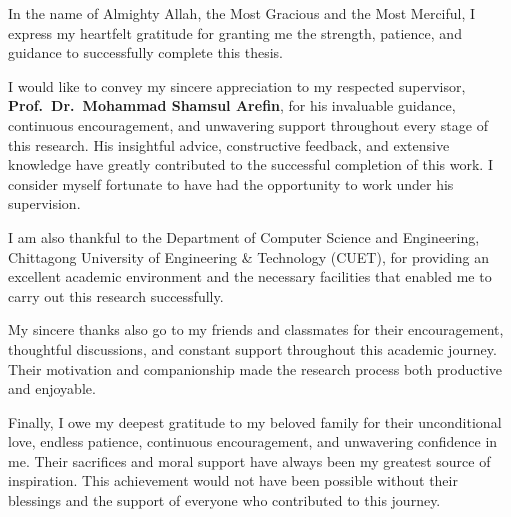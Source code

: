 
\begin{acknowledgements}

\hspace{4em}In the name of Almighty Allah, the Most Gracious and the Most Merciful, I express my heartfelt gratitude for granting me the strength, patience, and guidance to successfully complete this thesis.

\hspace{4em}I would like to convey my sincere appreciation to my respected supervisor, \textbf{Prof.\ Dr.\ Mohammad Shamsul Arefin}, for his invaluable guidance, continuous encouragement, and unwavering support throughout every stage of this research. His insightful advice, constructive feedback, and extensive knowledge have greatly contributed to the successful completion of this work. I consider myself fortunate to have had the opportunity to work under his supervision.

\hspace{4em}I am also thankful to the Department of Computer Science and Engineering, Chittagong University of Engineering \& Technology (CUET), for providing an excellent academic environment and the necessary facilities that enabled me to carry out this research successfully.

\hspace{4em}My sincere thanks also go to my friends and classmates for their encouragement, thoughtful discussions, and constant support throughout this academic journey. Their motivation and companionship made the research process both productive and enjoyable.

\hspace{4em}Finally, I owe my deepest gratitude to my beloved family for their unconditional love, endless patience, continuous encouragement, and unwavering confidence in me. Their sacrifices and moral support have always been my greatest source of inspiration. This achievement would not have been possible without their blessings and the support of everyone who contributed to this journey.

\end{acknowledgements}

